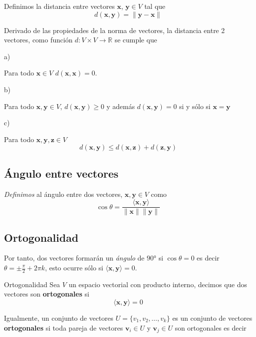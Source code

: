 \documentclass[
]{article}
\begin{document}
Definimos la distancia entre vectores \(\mathbf{x}\),
\(\mathbf{y}\in V\) tal que \[
d(\mathbf{x},\mathbf{y})=\|\mathbf{y}-\mathbf{x}\|
\]

Derivado de las propiedades de la norma de vectores, la distancia entre
2 vectores, como función \(d:V\times V\rightarrow \mathbb{R}\) se cumple
que

a)

Para todo \(\mathbf{x}\in V\) \(d(\mathbf{x},\mathbf{x})=0\).

b)

Para todo \(\mathbf{x},\mathbf{y}\in V\),
\(d(\mathbf{x},\mathbf{y})\geq 0\) y además
\(d(\mathbf{x},\mathbf{y})=0\) si y sólo si \(\mathbf{x}=\mathbf{y}\)

c)

Para todo \(\mathbf{x},\mathbf{y},\mathbf{z}\in V\) \[
  d(\mathbf{x},\mathbf{y}) \leq d(\mathbf{x},\mathbf{z})+d(\mathbf{z},\mathbf{y})
  \]

\hypertarget{uxe1ngulo-entre-vectores}{%
\subsection{Ángulo entre vectores}\label{uxe1ngulo-entre-vectores}}

\emph{Definimos} al ángulo entre dos vectores,
\(\mathbf{x},\mathbf{y}\in V\) como \[
\cos\theta = \frac{\langle \mathbf{x}, \mathbf{y}\rangle}{\|\mathbf{x}\|\|\mathbf{y}\|}
\]

\hypertarget{ortogonalidad}{%
\subsection{Ortogonalidad}\label{ortogonalidad}}

Por tanto, dos vectores formarán un \emph{ángulo} de \(90°\) si
\(\cos \theta=0\) es decir \(\theta= \pm \frac{\pi}{2}+2\pi k\), esto
ocurre sólo si \(\langle \mathbf{x},\mathbf{y}\rangle = 0\).

Ortogonalidad Sea \(V\) un espacio vectorial con producto interno,
decimos que dos vectores son \textbf{ortogonales} si \begin{equation}
  \langle \mathbf{x}, \mathbf{y} \rangle =0
  \end{equation}

Igualmente, un conjunto de vectores \(U=\{v_1,v_2,\ldots,v_k\}\) es un
conjunto de vectores \textbf{ortogonales} si toda pareja de vectores
\(\mathbf{v}_i\in U\) y \(\mathbf{v}_j\in U\) son ortogonales es decir
\end{document}
